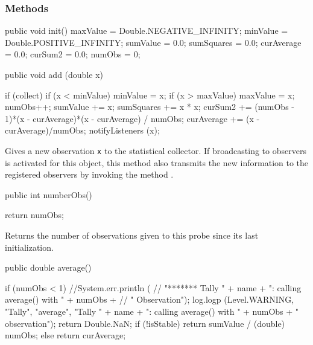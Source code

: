 \subsubsection* {Methods}
\begin{code}\begin{hide}

   public void init() {
       maxValue = Double.NEGATIVE_INFINITY;
       minValue = Double.POSITIVE_INFINITY;
       sumValue = 0.0;
       sumSquares = 0.0;
       curAverage = 0.0;
       curSum2 = 0.0;
       numObs = 0;
   }\end{hide}

   public void add (double x) \begin{hide} {
      if (collect) {
         if (x < minValue) minValue = x;
         if (x > maxValue) maxValue = x;
         numObs++;
         sumValue += x;
         sumSquares += x * x;
         curSum2 += (numObs - 1)*(x - curAverage)*(x - curAverage) / numObs;
         curAverage += (x - curAverage)/numObs;
      }
      notifyListeners (x);
   }\end{hide}
\end{code}
  \begin{tabb}  Gives a new observation \texttt{x} to the statistical collector.
   If broadcasting to observers is activated for this object,
   this method also transmits the new information to the
   registered observers by invoking the method
   .
 \end{tabb}
\begin{htmlonly}
\end{htmlonly}
\begin{code}

   public int numberObs() \begin{hide} {
      return numObs;
   } \end{hide}
\end{code}
  \begin{tabb} Returns the number of observations given to this probe
   since its last initialization.
  \end{tabb}
\begin{htmlonly}
\end{htmlonly}
\begin{code}

   public double average() \begin{hide} {
      if (numObs < 1) {
         //System.err.println (
         //    "******* Tally " + name + ":   calling average() with " + numObs +
         //    " Observation");
         log.logp (Level.WARNING, "Tally", "average",
            "Tally " + name + ":   calling average() with " + numObs +
             " observation");
         return Double.NaN;
      }
      if (!isStable)
         return sumValue / (double) numObs;
      else
         return curAverage;
   }\end{hide}
\end{code}
